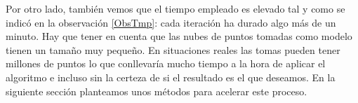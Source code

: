 Por otro lado, también vemos que el tiempo empleado es elevado tal y como se indicó en la observación \ref{ObsTmp}: cada iteración ha durado algo más de un minuto. Hay que tener en cuenta que las nubes de puntos tomadas como modelo tienen un tamaño muy pequeño. En situaciones reales las tomas pueden tener millones de puntos lo que conllevaría mucho tiempo a la hora de aplicar el algoritmo e incluso sin la certeza de si el resultado es el que deseamos. En la siguiente sección planteamos unos métodos para acelerar este proceso.

